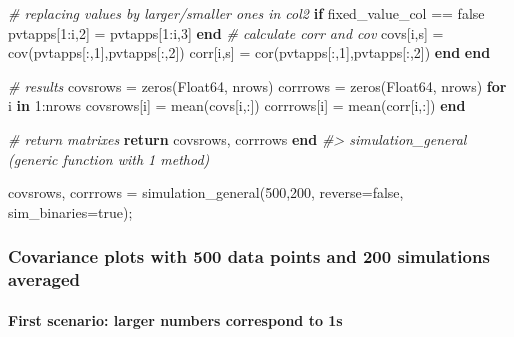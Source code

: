 \documentclass[]{article}
\newenvironment{Shaded}{\begin{snugshade}}{\end{snugshade}}
\newcommand{\CommentTok}[1]{\textcolor[rgb]{0.56,0.35,0.01}{\textit{#1}}}
\newcommand{\DataTypeTok}[1]{\textcolor[rgb]{0.13,0.29,0.53}{#1}}
\newcommand{\FloatTok}[1]{\textcolor[rgb]{0.00,0.00,0.81}{#1}}
\newcommand{\KeywordTok}[1]{\textcolor[rgb]{0.13,0.29,0.53}{\textbf{#1}}}
\newcommand{\NormalTok}[1]{#1}
\let\oldparagraph\paragraph
\renewcommand{\paragraph}[1]{\oldparagraph{#1}\mbox{}}
\begin{document}
\begin{Shaded}
\begin{Highlighting}[]
            \CommentTok{# replacing values by larger/smaller ones in col2}
            \KeywordTok{if}\NormalTok{ fixed_value_col == false}
\NormalTok{                pvtapps[}\FloatTok{1}\NormalTok{:i,}\FloatTok{2}\NormalTok{] = pvtapps[}\FloatTok{1}\NormalTok{:i,}\FloatTok{3}\NormalTok{]}
            \KeywordTok{end}
            \CommentTok{# calculate corr and cov}
\NormalTok{            covs[i,s] = cov(pvtapps[:,}\FloatTok{1}\NormalTok{],pvtapps[:,}\FloatTok{2}\NormalTok{])}
\NormalTok{            corr[i,s] = cor(pvtapps[:,}\FloatTok{1}\NormalTok{],pvtapps[:,}\FloatTok{2}\NormalTok{])}
        \KeywordTok{end}
    \KeywordTok{end}

    \CommentTok{# results}
\NormalTok{    covsrows = zeros(}\DataTypeTok{Float64}\NormalTok{, nrows)}
\NormalTok{    corrrows = zeros(}\DataTypeTok{Float64}\NormalTok{, nrows)}
    \KeywordTok{for}\NormalTok{ i }\KeywordTok{in} \FloatTok{1}\NormalTok{:nrows}
\NormalTok{        covsrows[i] = mean(covs[i,:])}
\NormalTok{        corrrows[i] = mean(corr[i,:])}
    \KeywordTok{end}

    \CommentTok{# return matrixes}
    \KeywordTok{return}\NormalTok{ covsrows, corrrows}
\KeywordTok{end}
\CommentTok{#> simulation_general (generic function with 1 method)}
\end{Highlighting}
\end{Shaded}

\begin{Shaded}
\begin{Highlighting}[]
\NormalTok{covsrows, corrrows = simulation_general(}\FloatTok{500}\NormalTok{,}\FloatTok{200}\NormalTok{, reverse=false, sim_binaries=true);}
\end{Highlighting}
\end{Shaded}

\newpage

\hypertarget{covariance-plots-with-500-data-points-and-200-simulations-averaged}{%
\subsubsection{Covariance plots with 500 data points and 200 simulations
averaged}\label{covariance-plots-with-500-data-points-and-200-simulations-averaged}}

\hypertarget{first-scenario-larger-numbers-correspond-to-1s}{%
\paragraph{First scenario: larger numbers correspond to
1s}\label{first-scenario-larger-numbers-correspond-to-1s}}
\end{document}
